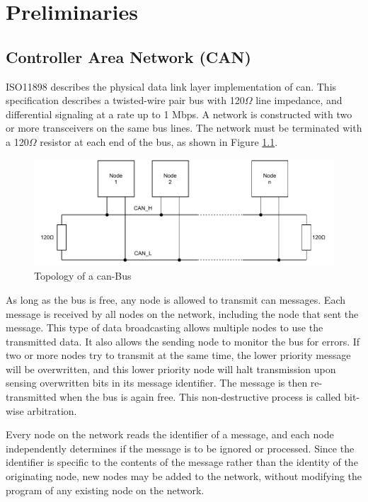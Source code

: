 \chapter{Preliminaries}




\section{Controller Area Network (CAN)}
ISO11898 describes the physical data link layer implementation of \acrshort{can}. This specification describes a twisted-wire pair bus with 120$\Omega$ line impedance, and differential signaling at a rate up to 1 Mbps. A network is constructed with two or more transceivers on the same bus lines. The network must be terminated with a 120$\Omega$ resistor at each end of the bus, as shown in Figure \ref{fig:can-bus_topology}.


\begin{figure}[h!]
	\centering
	\includegraphics[height=4cm]{images/can-bus_topology}
	\caption{Topology of a \acrshort{can}-Bus}
	\vspace{-1.4ex}
	\label{fig:can-bus_topology}
\end{figure}

As long as the bus is free, any node is allowed to transmit \acrshort{can} messages. Each message is received by all nodes on the network, including the node that sent the message. This type of data broadcasting allows multiple nodes to use the transmitted data. It also allows the sending node to monitor the bus for errors. If two or more nodes try to transmit at the same time, the lower priority message will be overwritten, and this lower priority node will halt transmission upon sensing overwritten bits in its message identifier. The message is then re-transmitted when the bus is again free. This non-destructive process is called bit-wise arbitration.

Every node on the network reads the identifier of a message, and each node independently determines if the message is to be ignored or processed. Since the identifier is specific to the contents of the message rather than the identity of the originating node, new nodes may be added to the network, without modifying the program of any existing node on the network.

